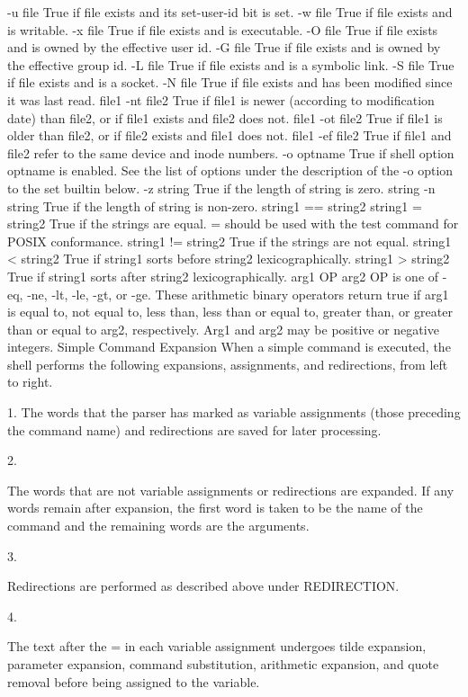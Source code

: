 \documentclass[11pt]{article}
\begin{document}
{{{-u file
True if file exists and its set-user-id bit is set.
-w file
True if file exists and is writable.
-x file
True if file exists and is executable.
-O file
True if file exists and is owned by the effective user id.
-G file
True if file exists and is owned by the effective group id.
-L file
True if file exists and is a symbolic link.
-S file
True if file exists and is a socket.
-N file
True if file exists and has been modified since it was last read.
file1 -nt file2
True if file1 is newer (according to modification date) than file2, or if file1 exists and file2 does not.
file1 -ot file2
True if file1 is older than file2, or if file2 exists and file1 does not.
file1 -ef file2
True if file1 and file2 refer to the same device and inode numbers.
-o optname
True if shell option optname is enabled. See the list of options under the description of the -o option to the set builtin below.
-z string
True if the length of string is zero.
string
-n string
True if the length of string is non-zero.
string1 == string2
string1 = string2
True if the strings are equal. = should be used with the test command for POSIX conformance.
string1 != string2
True if the strings are not equal.
string1 < string2
True if string1 sorts before string2 lexicographically.
string1 > string2
True if string1 sorts after string2 lexicographically.
arg1 OP arg2
OP is one of -eq, -ne, -lt, -le, -gt, or -ge. These arithmetic binary operators return true if arg1 is equal to, not equal to, less than, less than or equal to, greater than, or greater than or equal to arg2, respectively. Arg1 and arg2 may be positive or negative integers.
Simple Command Expansion
When a simple command is executed, the shell performs the following expansions, assignments, and redirections, from left to right.

1.
The words that the parser has marked as variable assignments (those preceding the command name) and redirections are saved for later processing.

2.

The words that are not variable assignments or redirections are expanded. If any words remain after expansion, the first word is taken to be the name of the command and the remaining words are the arguments.

3.

Redirections are performed as described above under REDIRECTION.

4.

The text after the = in each variable assignment undergoes tilde expansion, parameter expansion, command substitution, arithmetic expansion, and quote removal before being assigned to the variable.

}}}
\end{document}
